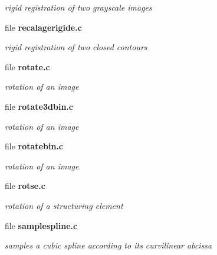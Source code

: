 \begin{DoxyCompactItemize}
\begin{DoxyCompactList}\small\item\em rigid registration of two grayscale images \item\end{DoxyCompactList}

\item 
file {\bf recalagerigide.c}


\begin{DoxyCompactList}\small\item\em rigid registration of two closed contours \item\end{DoxyCompactList}

\item 
file {\bf rotate.c}


\begin{DoxyCompactList}\small\item\em rotation of an image \item\end{DoxyCompactList}

\item 
file {\bf rotate3dbin.c}


\begin{DoxyCompactList}\small\item\em rotation of an image \item\end{DoxyCompactList}

\item 
file {\bf rotatebin.c}


\begin{DoxyCompactList}\small\item\em rotation of an image \item\end{DoxyCompactList}

\item 
file {\bf rotse.c}


\begin{DoxyCompactList}\small\item\em rotation of a structuring element \item\end{DoxyCompactList}

\item 
file {\bf samplespline.c}


\begin{DoxyCompactList}\small\item\em samples a cubic spline according to its curvilinear abcissa \item\end{DoxyCompactList}


\end{DoxyCompactItemize}
